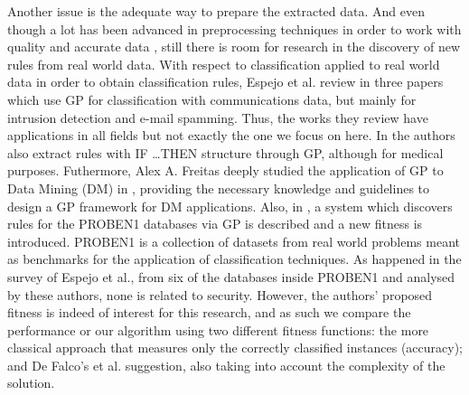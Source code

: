 \documentclass[runningheads]{llncs}
\begin{document}
Another issue is the adequate way to prepare the extracted data. And even though a lot has been advanced in preprocessing techniques in order to work with quality and accurate data \cite{han2011data}, still there is room for research in the discovery of new rules from real world data. With respect to classification applied to real world data in order to obtain classification rules, Espejo et al. review in \cite{espejo2010survey} three papers which use GP for classification with
communications data, but mainly for intrusion detection and e-mail
spamming. Thus, the works they review have applications in
all fields but not exactly the one we focus on here. In \cite{Tsakonas2004195} the authors also extract rules with \textsc{IF \ldots THEN} structure through GP, although for medical purposes. Futhermore, Alex A. Freitas deeply studied the application of GP to Data Mining (DM) in \cite{freitas2002data}, providing the necessary knowledge and guidelines to design a GP framework for DM applications. Also, in \cite{DeFalco2002257}, a system which discovers
rules for the PROBEN1 databases via GP is described and a new fitness is introduced. PROBEN1 \cite{prechelt1994proben} is a collection of datasets from real world problems meant as benchmarks for the application of classification techniques. As happened in 
the survey of Espejo et al., from six of the databases inside PROBEN1 and
analysed by these authors, none is related to security. However, the
authors' proposed fitness is indeed of interest for this research, and
as such we compare the performance or our algorithm using two
different fitness functions: the more classical approach that measures
only the correctly classified instances (accuracy); and De Falco's et
al. \cite{DeFalco2002257} suggestion, also taking into account the
complexity of the solution.
\end{document}

